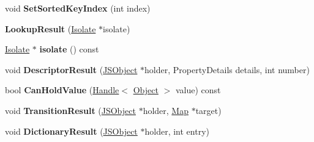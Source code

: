 \begin{DoxyCompactItemize}
\item 
\hypertarget{classv8_1_1internal_1_1_b_a_s_e___e_m_b_e_d_d_e_d_ac13edd8001b14420413a3e3c31a78f5e}{}void {\bfseries Set\+Sorted\+Key\+Index} (int index)\label{classv8_1_1internal_1_1_b_a_s_e___e_m_b_e_d_d_e_d_ac13edd8001b14420413a3e3c31a78f5e}

\item 
\hypertarget{classv8_1_1internal_1_1_b_a_s_e___e_m_b_e_d_d_e_d_aef8132ff275e9af50d3ce545c39a870b}{}{\bfseries Lookup\+Result} (\hyperlink{classv8_1_1internal_1_1_isolate}{Isolate} $\ast$isolate)\label{classv8_1_1internal_1_1_b_a_s_e___e_m_b_e_d_d_e_d_aef8132ff275e9af50d3ce545c39a870b}

\item 
\hypertarget{classv8_1_1internal_1_1_b_a_s_e___e_m_b_e_d_d_e_d_aafca7727b44748c75ff39a90282dfb8d}{}\hyperlink{classv8_1_1internal_1_1_isolate}{Isolate} $\ast$ {\bfseries isolate} () const \label{classv8_1_1internal_1_1_b_a_s_e___e_m_b_e_d_d_e_d_aafca7727b44748c75ff39a90282dfb8d}

\item 
\hypertarget{classv8_1_1internal_1_1_b_a_s_e___e_m_b_e_d_d_e_d_aee2f66efc1a5d405bda56df52de3964e}{}void {\bfseries Descriptor\+Result} (\hyperlink{classv8_1_1internal_1_1_j_s_object}{J\+S\+Object} $\ast$holder, Property\+Details details, int number)\label{classv8_1_1internal_1_1_b_a_s_e___e_m_b_e_d_d_e_d_aee2f66efc1a5d405bda56df52de3964e}

\item 
\hypertarget{classv8_1_1internal_1_1_b_a_s_e___e_m_b_e_d_d_e_d_aa8b470c1eec1bc3f421e685a657f0775}{}bool {\bfseries Can\+Hold\+Value} (\hyperlink{classv8_1_1internal_1_1_handle}{Handle}$<$ \hyperlink{classv8_1_1internal_1_1_object}{Object} $>$ value) const \label{classv8_1_1internal_1_1_b_a_s_e___e_m_b_e_d_d_e_d_aa8b470c1eec1bc3f421e685a657f0775}

\item 
\hypertarget{classv8_1_1internal_1_1_b_a_s_e___e_m_b_e_d_d_e_d_aec5458f3601d6bcd89b2a75c6e4b282b}{}void {\bfseries Transition\+Result} (\hyperlink{classv8_1_1internal_1_1_j_s_object}{J\+S\+Object} $\ast$holder, \hyperlink{classv8_1_1internal_1_1_map}{Map} $\ast$target)\label{classv8_1_1internal_1_1_b_a_s_e___e_m_b_e_d_d_e_d_aec5458f3601d6bcd89b2a75c6e4b282b}

\item 
\hypertarget{classv8_1_1internal_1_1_b_a_s_e___e_m_b_e_d_d_e_d_a61f70f78b08f0da42e4ffae3052d515a}{}void {\bfseries Dictionary\+Result} (\hyperlink{classv8_1_1internal_1_1_j_s_object}{J\+S\+Object} $\ast$holder, int entry)\label{classv8_1_1internal_1_1_b_a_s_e___e_m_b_e_d_d_e_d_a61f70f78b08f0da42e4ffae3052d515a}


\end{DoxyCompactItemize}
